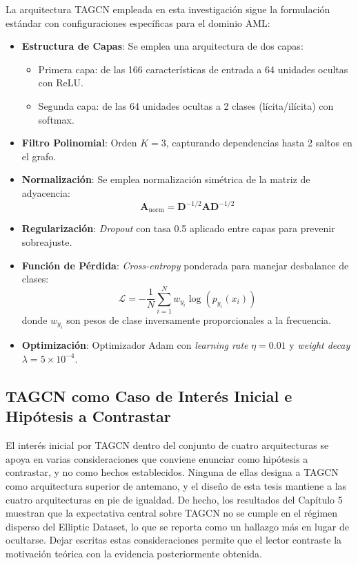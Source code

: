 La arquitectura TAGCN empleada en esta investigación sigue la formulación estándar con configuraciones específicas para el dominio AML:

\begin{itemize}
    \item \textbf{Estructura de Capas}: Se emplea una arquitectura de dos capas:
    \begin{itemize}
        \item Primera capa: de las 166 características de entrada a 64 unidades ocultas con ReLU.
        \item Segunda capa: de las 64 unidades ocultas a 2 clases (lícita/ilícita) con softmax.
    \end{itemize}
    \item \textbf{Filtro Polinomial}: Orden $K=3$, capturando dependencias hasta 2 saltos en el grafo.
    \item \textbf{Normalización}: Se emplea normalización simétrica de la matriz de adyacencia:
    \[ \mathbf{A}_{\text{norm}} = \mathbf{D}^{-1/2} \mathbf{A} \mathbf{D}^{-1/2} \]
    \item \textbf{Regularización}: \textit{Dropout} con tasa 0.5 aplicado entre capas para prevenir sobreajuste.
    \item \textbf{Función de Pérdida}: \textit{Cross-entropy} ponderada para manejar desbalance de clases:
    \[ \mathcal{L} = -\frac{1}{N} \sum_{i=1}^{N} w_{y_i} \log(p_{y_i}(x_i)) \]
    donde $w_{y_i}$ son pesos de clase inversamente proporcionales a la frecuencia.
    \item \textbf{Optimización}: Optimizador Adam con \textit{learning rate} $\eta = 0.01$ y \textit{weight decay} $\lambda = 5 \times 10^{-4}$.
\end{itemize}

\subsection{TAGCN como Caso de Interés Inicial e Hipótesis a Contrastar}

El interés inicial por TAGCN dentro del conjunto de cuatro arquitecturas se apoya en varias consideraciones que conviene enunciar como hipótesis a contrastar, y no como hechos establecidos. Ninguna de ellas designa a TAGCN como arquitectura superior de antemano, y el diseño de esta tesis mantiene a las cuatro arquitecturas en pie de igualdad. De hecho, los resultados del Capítulo 5 muestran que la expectativa central sobre TAGCN no se cumple en el régimen disperso del Elliptic Dataset, lo que se reporta como un hallazgo más en lugar de ocultarse. Dejar escritas estas consideraciones permite que el lector contraste la motivación teórica con la evidencia posteriormente obtenida.


